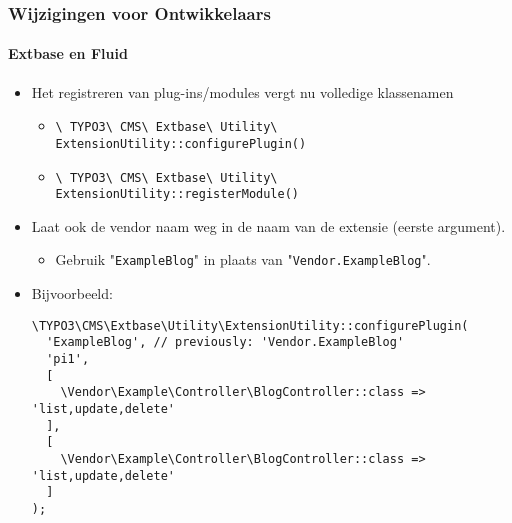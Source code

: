 
\begin{frame}[fragile]
	\frametitle{Wijzigingen voor Ontwikkelaars}
	\framesubtitle{Extbase en Fluid}

	\lstset{basicstyle=\tiny\ttfamily}

	\begin{itemize}
		\item Het registreren van plug-ins/modules vergt nu volledige klassenamen

			\begin{itemize}\smaller
				\item \texttt{\textbackslash
					TYPO3\textbackslash
					CMS\textbackslash
					Extbase\textbackslash
					Utility\textbackslash
					ExtensionUtility::configurePlugin()}
				\item \texttt{\textbackslash
					TYPO3\textbackslash
					CMS\textbackslash
					Extbase\textbackslash
					Utility\textbackslash
					ExtensionUtility::registerModule()}
			\end{itemize}\normalsize

		\item Laat ook de vendor naam weg in de naam van de extensie (eerste argument).

			\begin{itemize}\smaller
				\item[\ding{228}] Gebruik "\texttt{ExampleBlog}" in plaats van "\texttt{Vendor.ExampleBlog}".
			\end{itemize}

		\item Bijvoorbeeld:

\begin{lstlisting}
\TYPO3\CMS\Extbase\Utility\ExtensionUtility::configurePlugin(
  'ExampleBlog', // previously: 'Vendor.ExampleBlog'
  'pi1',
  [
    \Vendor\Example\Controller\BlogController::class => 'list,update,delete'
  ],
  [
    \Vendor\Example\Controller\BlogController::class => 'list,update,delete'
  ]
);
\end{lstlisting}

	\end{itemize}

\end{frame}


